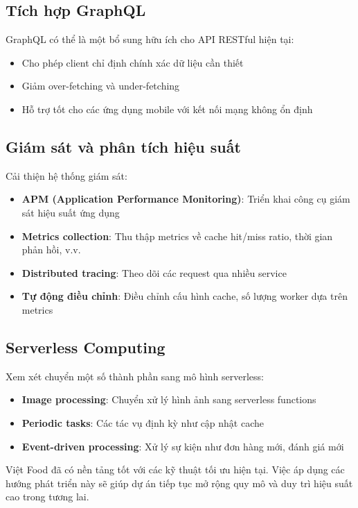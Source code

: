\subsection{Tích hợp GraphQL}
GraphQL có thể là một bổ sung hữu ích cho API RESTful hiện tại:
\begin{itemize}
    \item Cho phép client chỉ định chính xác dữ liệu cần thiết
    \item Giảm over-fetching và under-fetching
    \item Hỗ trợ tốt cho các ứng dụng mobile với kết nối mạng không ổn định
\end{itemize}

\subsection{Giám sát và phân tích hiệu suất}
Cải thiện hệ thống giám sát:
\begin{itemize}
    \item \textbf{APM (Application Performance Monitoring)}: Triển khai công cụ giám sát hiệu suất ứng dụng
    \item \textbf{Metrics collection}: Thu thập metrics về cache hit/miss ratio, thời gian phản hồi, v.v.
    \item \textbf{Distributed tracing}: Theo dõi các request qua nhiều service
    \item \textbf{Tự động điều chỉnh}: Điều chỉnh cấu hình cache, số lượng worker dựa trên metrics
\end{itemize}

\subsection{Serverless Computing}
Xem xét chuyển một số thành phần sang mô hình serverless:
\begin{itemize}
    \item \textbf{Image processing}: Chuyển xử lý hình ảnh sang serverless functions
    \item \textbf{Periodic tasks}: Các tác vụ định kỳ như cập nhật cache
    \item \textbf{Event-driven processing}: Xử lý sự kiện như đơn hàng mới, đánh giá mới
\end{itemize}

Việt Food đã có nền tảng tốt với các kỹ thuật tối ưu hiện tại. Việc áp dụng các hướng phát triển này sẽ giúp dự án tiếp tục mở rộng quy mô và duy trì hiệu suất cao trong tương lai.
